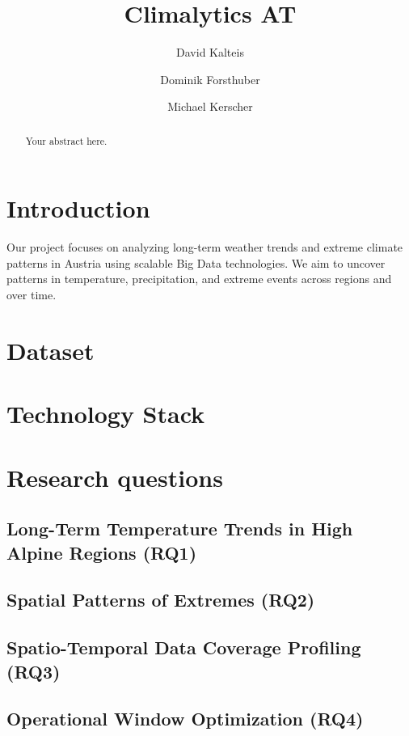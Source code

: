 \documentclass[sigconf]{acmart}
\title{Climalytics AT}
\author{David Kalteis}
\affiliation{\institution{FH Hagenberg}\department{Mobile Computing}\country{Austria}}
\author{Dominik Forsthuber}
\affiliation{\institution{FH Hagenberg}\department{Mobile Computing}\country{Austria}}
\author{Michael Kerscher}
\affiliation{\institution{FH Hagenberg}\department{Mobile Computing}\country{Austria}}
\begin{document}
\begin{abstract}
Your abstract here.
\end{abstract}

\maketitle

\section{Introduction}
Our project focuses on analyzing long-term weather trends and extreme climate patterns in Austria using scalable Big Data technologies. We aim to uncover patterns in temperature, precipitation, and extreme events across regions and over time.

\section{Dataset}


\section{Technology Stack}


\section{Research questions}
\subsection{Long-Term Temperature Trends in High Alpine Regions (RQ1)}


\subsection{Spatial Patterns of Extremes (RQ2)}


\subsection{Spatio-Temporal Data Coverage Profiling (RQ3)}


\subsection{Operational Window Optimization (RQ4)}




\end{document}
